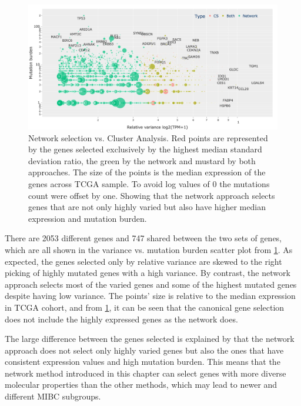 \begin{figure}[!t]    
    \centering\includegraphics[width=1.0\textwidth,keepaspectratio]{Sections/Network_I/Resources/Tum_network/ClusteringAnalysis_vs_Network_3.png}
    \caption[Gene selection: network vs cluster analysis]{Network selection vs. Cluster Analysis. Red points are represented by the genes selected exclusively by the highest median standard deviation ratio, the green by the network and mustard by both approaches. The size of the points is the median expression of the genes across TCGA sample. To avoid log values of 0 the mutations count were offset by one. Showing that the network approach selects genes that are not only highly varied but also have higher median expression and mutation burden.}
    \label{fig:N_I:network_ca_selection}
\end{figure}

There are 2053 different genes and 747 shared between the two sets of genes, which are all shown in the variance vs. mutation burden scatter plot from \cref{fig:N_I:network_ca_selection}. As expected, the genes selected only by relative variance are skewed to the right picking of highly mutated genes with a high variance. By contrast, the network approach selects most of the varied genes and some of the highest mutated genes despite having low variance. The points' size is relative to the median expression in TCGA cohort, and from \cref{fig:N_I:network_ca_selection}, it can be seen that the canonical gene selection does not include the highly expressed genes as the network does.

The large difference between the genes selected is explained by that the network approach does not select only highly varied genes but also the ones that have consistent expression values and high mutation burden. This means that the network method introduced in this chapter can select genes with more diverse molecular properties than the other methods, which may lead to newer and different MIBC subgroups.


